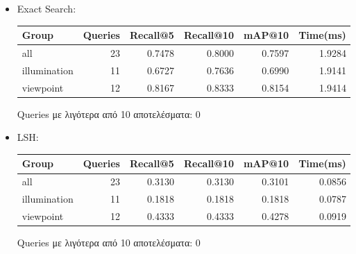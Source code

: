 \documentclass [conference]{IEEEtran}
\begin{document}
\begin{itemize}
    \item Exact Search:
    \begin{table}[H]
    \centering
    \small
    \setlength{\tabcolsep}{3pt}
    \begin{tabular}{l r r r r r}
    \hline
    \textbf{Group} & \textbf{Queries} & \textbf{Recall@5} & \textbf{Recall@10} & \textbf{mAP@10} & \textbf{Time(ms)} \\
    \hline
    all & 23 & 0.7478 & 0.8000 & 0.7597 & 1.9284 \\
    illumination & 11 & 0.6727 & 0.7636 & 0.6990 & 1.9141 \\
    viewpoint & 12 & 0.8167 & 0.8333 & 0.8154 & 1.9414 \\
    \hline
    \end{tabular}
    \par\smallskip
    \footnotesize Queries με λιγότερα από 10 αποτελέσματα: 0
    \end{table}


    \item LSH:
    \begin{table}[H]
    \centering
    \small
    \setlength{\tabcolsep}{3pt}
    \begin{tabular}{l r r r r r}
    \hline
    \textbf{Group} & \textbf{Queries} & \textbf{Recall@5} & \textbf{Recall@10} & \textbf{mAP@10} & \textbf{Time(ms)} \\
    \hline
    all & 23 & 0.3130 & 0.3130 & 0.3101 & 0.0856 \\
    illumination & 11 & 0.1818 & 0.1818 & 0.1818 & 0.0787 \\
    viewpoint & 12 & 0.4333 & 0.4333 & 0.4278 & 0.0919 \\
    \hline
    \end{tabular}
    \par\smallskip
    \footnotesize Queries με λιγότερα από 10 αποτελέσματα: 0
    \end{table}



\end{itemize}
\end{document}
